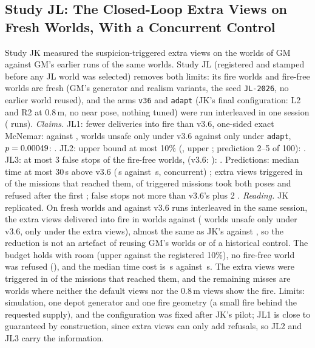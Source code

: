 \subsection{Study JL: The Closed-Loop Extra Views on Fresh Worlds, With a Concurrent Control}\label{sec:moved-jl}
Study JK measured the suspicion-triggered extra views on the worlds of GM against GM's earlier runs of the same worlds. Study JL (registered and stamped before any JL world was selected) removes both limits: its \JLWorlds{} fire worlds and \JLPlain{} fire-free worlds are fresh (GM's generator and realism variants, the seed \texttt{JL-2026}, no earlier world reused), and the arms \texttt{v36} and \texttt{adapt} (JK's final configuration: L2 and R2 at 0.8\,m, no near pose, nothing tuned) were run interleaved in one session (\JLTrials{} runs).
\emph{Claims.} JL1: fewer deliveries into fire than v3.6, one-sided exact McNemar: \JLAdapt{} against \JLV{}, \JLOnlyV{} worlds unsafe only under v3.6 against \JLOnlyAdapt{} only under \texttt{adapt}, $p=0.00049$: \JLOneHolds. JL2: upper bound at most 10\% (\JLAdaptRate{}, upper \JLAdaptUpper; prediction 2--5 of 100): \JLTwoHolds. JL3: at most 3 false stops of the fire-free worlds, \JLFalseStops{} (v3.6: \JLFalseStopsV): \JLThreeHolds. Predictions: median time at most 30\,s above v3.6 (\JLTimeAdapt\,s against \JLTimeV\,s, concurrent) \JLPredOneHolds; extra views triggered in \JLTriggerShare{} of the \JLReached{} missions that reached them, \JLAllExtras{} of \JLTriggered{} triggered missions took both poses and \JLRefusedEarly{} refused after the first \JLPredTwoHolds; false stops not more than v3.6's plus 2 \JLPredThreeHolds.
\emph{Reading.} JK replicated. On fresh worlds and against v3.6 runs interleaved in the same session, the extra views delivered into fire in \JLAdapt{} worlds against \JLV{} (\JLOnlyV{} worlds unsafe only under v3.6, \JLOnlyAdapt{} only under the extra views), almost the same as JK's \JKAdapt{} against \JKV{}, so the reduction is not an artefact of reusing GM's worlds or of a historical control. The budget holds with room (upper \JLAdaptUpper{} against the registered 10\%), no fire-free world was refused (\JLFalseStops), and the median time cost is \JLTimeAdapt\,s against \JLTimeV\,s. The extra views were triggered in \JLTriggerShare{} of the missions that reached them, and the remaining misses are worlds where neither the default views nor the 0.8\,m views show the fire. Limits: simulation, one depot generator and one fire geometry (a small fire behind the requested supply), and the configuration was fixed after JK's pilot; JL1 is close to guaranteed by construction, since extra views can only add refusals, so JL2 and JL3 carry the information.
